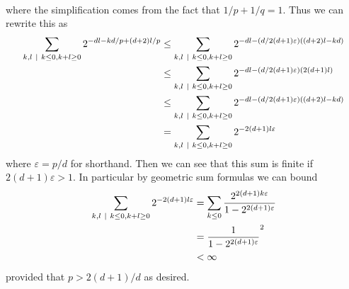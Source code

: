 \documentclass{scrartcl}
\begin{document}
\begin{solution}
\begin{align*}
\end{align*} where the simplification comes from the fact that $1/p + 1/q = 1$. Thus 
we can rewrite this as \begin{align*}
\sum_{k,l\ \vert \  k\leq 0, k+l\geq 0}2^{-dl - kd/p + (d+2)l/p}
&\leq \sum_{k,l\ \vert \  k\leq 0, k+l\geq 0}2^{-dl - (d/2(d+1)\varepsilon)((d+2)l - kd)} \\
    &\leq  \sum_{k,l\ \vert \  k\leq 0, k+l\geq 0}2^{-dl - (d/2(d+1)\varepsilon)(2(d+1)l)} \\
    &\leq\sum_{k,l\ \vert \  k\leq 0, k+l\geq 0}2^{-dl - (d/2(d+1)\varepsilon)((d+2)l - kd)} \\
    &= \sum_{k,l\ \vert \  k\leq 0, k+l\geq 0}2^{-2(d+1)l\varepsilon} \\
\end{align*} where $\varepsilon = p/d$ for shorthand. Then we can see that this sum is finite if $2(d+1)\varepsilon > 1$.
In particular by geometric sum formulas we can bound 
\begin{align*}
    \sum_{k,l\ \vert \  k\leq 0, k+l\geq 0}2^{-2(d+1)l\varepsilon} &= \sum_{k\leq 0}\frac{2^{2(d+1)k\varepsilon}}{1- 2^{2(d+1)\varepsilon}}\\
    &= \frac{1}{1-2^{2(d+1)\varepsilon}}^2\\
    &< \infty
\end{align*} provided that $p > 2(d+1)/d$ as desired.

\end{solution}
\end{document}
